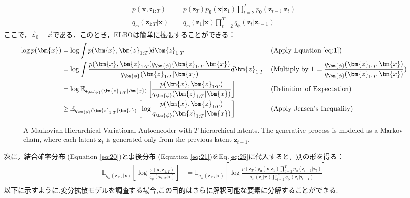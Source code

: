 \begin{align}
    p(\bm{x}, \bm{z}_{1:T}) &= p(\bm{z}_T)p_{\bm{\theta}}(\bm{x}|\bm{z}_1)\prod_{t=2}^{T}p_{\bm{\theta}}(\bm{z}_{t-1}|\bm{z}_{t}) \label{eq:20}\\
    q_{\bm{\phi}}(\bm{z}_{1:T}|\bm{x}) &= q_{\bm{\phi}}(\bm{z}_1|\bm{x})\prod_{t=2}^{T}q_{\bm{\phi}}(\bm{z}_{t}|\bm{z}_{t-1}) \label{eq:21}
\end{align}
ここで，$\Vec{z}_0 = \vec{x}$である．このとき，ELBOは簡単に拡張することができる：
\begin{align}
\log p(\bm{x}) &= \log \int p(\bm{x}, \bm{z}_{1:T}) d\bm{z}_{1:T}         && \text{(Apply Equation \ref{eq:1})}\\
&= \log \int \frac{p(\bm{x}, \bm{z}_{1:T})q_{\bm{\phi}}(\bm{z}_{1:T}|\bm{x})}{q_{\bm{\phi}}(\bm{z}_{1:T}|\bm{x})} d\bm{z}_{1:T}         && \text{(Multiply by 1 = $\frac{q_{\bm{\phi}}(\bm{z}_{1:T}|\bm{x})}{q_{\bm{\phi}}(\bm{z}_{1:T}|\bm{x})}$)}\\
&= \log \mathbb{E}_{q_{\bm{\phi}}(\bm{z}_{1:T}|\bm{x})}\left[\frac{p(\bm{x}, \bm{z}_{1:T})}{q_{\bm{\phi}}(\bm{z}_{1:T}|\bm{x})}\right]         && \text{(Definition of Expectation)}\\
&\geq \mathbb{E}_{q_{\bm{\phi}}(\bm{z}_{1:T}|\bm{x})}\left[\log \frac{p(\bm{x}, \bm{z}_{1:T})}{q_{\bm{\phi}}(\bm{z}_{1:T}|\bm{x})}\right]         && \text{(Apply Jensen's Inequality)} \label{eq:25}
\end{align}


\begin{figure}
  \centering
  \caption{A Markovian Hierarchical Variational Autoencoder with $T$ hierarchical latents.  The generative process is modeled as a Markov chain, where each latent $\bm{z}_t$ is generated only from the previous latent $\bm{z}_{t+1}$.}
  \label{fig:hvae}
\end{figure}


次に，結合確率分布 (Equation \ref{eq:20})と事後分布 (Equation \ref{eq:21})をEq.\eqref{eq:25}に代入すると，別の形を得る：
\begin{align}
\mathbb{E}_{q_{\bm{\phi}}(\bm{z}_{1:T}|\bm{x})}\left[\log \frac{p(\bm{x}, \bm{z}_{1:T})}{q_{\bm{\phi}}(\bm{z}_{1:T}|\bm{x})}\right]
&= \mathbb{E}_{q_{\bm{\phi}}(\bm{z}_{1:T}|\bm{x})}\left[\log \frac{p(\bm{z}_T)p_{\bm{\theta}}(\bm{x}|\bm{z}_1)\prod_{t=2}^{T}p_{\bm{\theta}}(\bm{z}_{t-1}|\bm{z}_{t})}{q_{\bm{\phi}}(\bm{z}_1|\bm{x})\prod_{t=2}^{T}q_{\bm{\phi}}(\bm{z}_{t}|\bm{z}_{t-1})}\right]
\end{align}
以下に示すように,変分拡散モデルを調査する場合,この目的はさらに解釈可能な要素に分解することができる.


